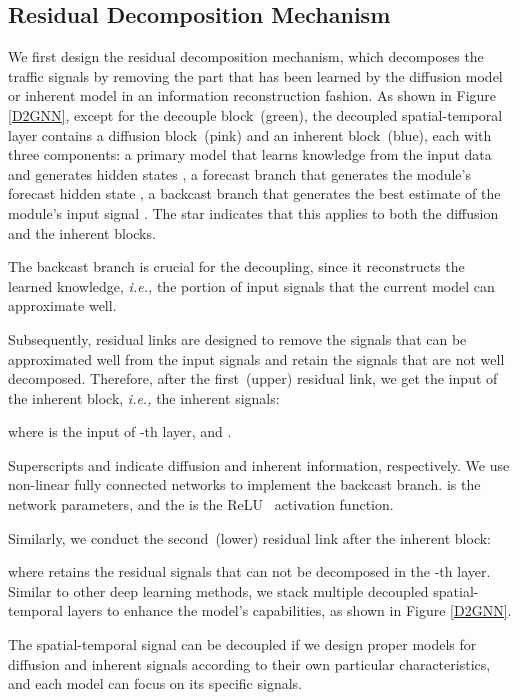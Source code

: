 \documentclass[sigconf, nonacm]{acmart}
\newcommand{\ie}{\textit{i.e.,}\xspace}
\begin{document}
\subsection{Residual Decomposition Mechanism}
\label{sec_res}
We first design the residual decomposition mechanism{\color{black}, which} decomposes the traffic signals {\color{black} by removing the part that has been learned by the diffusion model or inherent model in an information reconstruction fashion.}
As shown in Figure \ref{D2GNN}, {\color{black}except for the decouple block~(green), the decoupled spatial-temporal layer contains} a {\color{black}diffusion block~(pink)} and an {\color{black}inherent block~(blue)}, each with three components:
a primary model that learns knowledge from the input data {\color{black}} and generates hidden states , a forecast branch that generates the module's forecast hidden state , a backcast branch that generates the best estimate of the module's input signal . The star indicates that this applies to both the {\color{black}diffusion and the inherent blocks}.

{\color{black}The backcast branch is crucial for the decoupling, since it reconstructs the learned knowledge,} \ie the portion of input signals that the current model can approximate well.
{\color{black}
Subsequently, residual links are designed to remove the signals that can be approximated well from the input signals and retain the signals that are not well decomposed.
Therefore, after the first~(upper) residual link, we get the input of the {\color{black}inherent} block, \ie the {\color{black}inherent} signals:

where  is the input of -th layer, and .}
Superscripts {\color{black} and } indicate {\color{black}diffusion and inherent} information, respectively.
We use non-linear fully connected networks to implement the backcast branch.  is the network parameters, and the  is the ReLU~\cite{ReLU} activation function. 
{\color{black}
Similarly, we conduct the second~(lower) residual link after the {\color{black}inherent} block:

where  retains the residual signals that can not be decomposed in the -th layer. 
Similar to other deep learning methods, we stack multiple decoupled spatial-temporal layers to enhance the model's capabilities, as shown in Figure \ref{D2GNN}.}
The spatial-temporal signal can be decoupled if we design proper models for {\color{black}diffusion and inherent} signals according to their own particular characteristics, and each model can focus on its specific signals.
\end{document}
